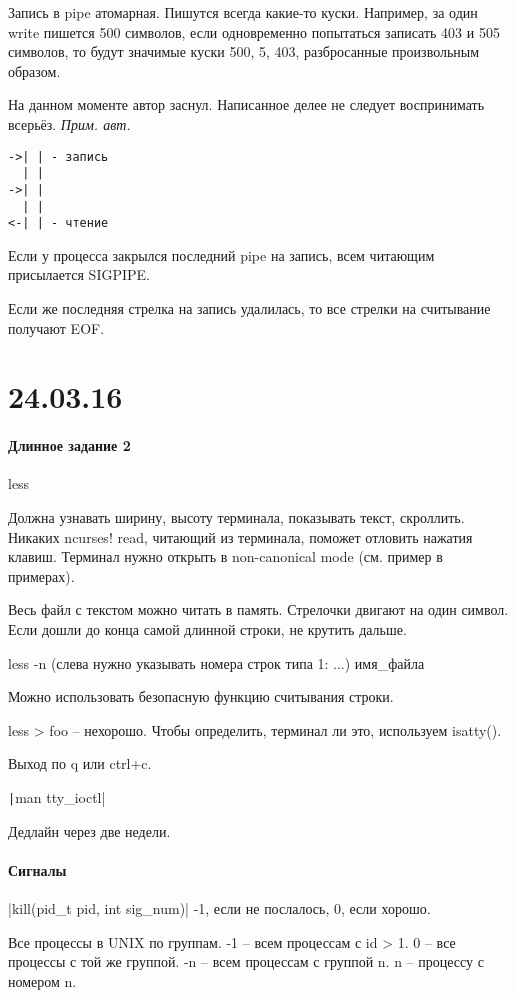 \documentclass[a4paper,10pt]{article}
\newcommand{\cl}{\mint{c}}
\begin{document}
Запись в pipe атомарная. Пишутся всегда какие-то куски. Например, за один write пишется 500 символов, если одновременно попытаться записать 403 и 505 символов, то будут значимые куски 500, 5, 403, разбросанные произвольным образом.

На данном моменте автор заснул. Написанное делее не следует воспринимать всерьёз.
\textit{Прим. авт.}

\begin{verbatim}
->| | - запись
  | |
->| |
  | |
<-| | - чтение
\end{verbatim}

Если у процесса закрылся последний pipe на запись, всем читающим присылается  SIGPIPE.

Если же последняя стрелка на запись удалилась, то все стрелки на считывание получают EOF.

\section{24.03.16}
\paragraph{Длинное задание 2}
less

Должна узнавать ширину, высоту терминала, показывать текст, скроллить. Никаких ncurses! read, читающий из терминала, поможет отловить нажатия клавиш. Терминал нужно открыть в non-canonical mode (см. пример в примерах).

Весь файл с текстом можно читать в память. Стрелочки двигают на один символ. Если дошли до конца самой длинной строки, не крутить дальше.

less -n (слева нужно указывать номера строк типа 1: ...) имя\_файла

Можно использовать безопасную функцию считывания строки.

less > foo -- нехорошо. Чтобы определить, терминал ли это, используем isatty().

Выход по q или ctrl+c.

\texttt|man tty_ioctl|

Дедлайн через две недели.

\paragraph{Сигналы}
\cl|kill(pid_t pid, int sig_num)|
-1, если не послалось, 0, если хорошо.

Все процессы в UNIX по группам. -1 -- всем процессам с id > 1. 0 -- все процессы с той же группой. -n -- всем процессам с группой n. n -- процессу с номером n.
\end{document}
